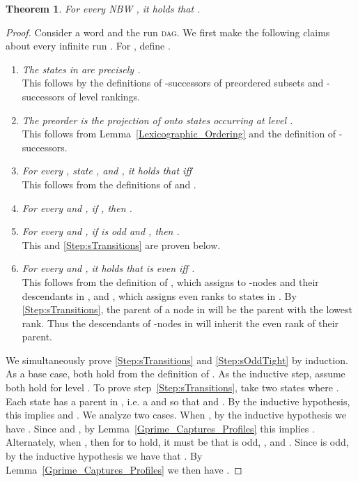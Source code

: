 \documentclass{LMCS}
\newcommand{\DAG}{\textsc{dag}\xspace}
\newtheorem{theorem}{Theorem}[section]
\begin{document}
\begin{theorem}\label{SR_Complement}
For every NBW , it holds that .
\end{theorem}
\begin{proof}
\cbstart
Consider a word  and the run \DAG . We first make the following claims
about every infinite run
.
For , define .

\begin{enumerate}[(1)]

\item\label{Step:psS} \textit{The states in  are precisely .}\\
This follows by the definitions of -successors of preordered subsets and 
-successors of level rankings.

\item\label{Step:pPreorder} \textit{The preorder  is the projection of 
onto states occurring at level .} \\
This follows from Lemma~\ref{Lexicographic_Ordering} and the definition of -successors. 

\item\label{Step:pTransitions} \textit{For every , state , and , it
holds that  iff }\\
This follows from the definitions of  and . 

\item\label{Step:sTransitions} \textit{For every  and , if , then .}

\item\label{Step:sOddTight} \textit{For every  and , if  is
odd and , then .}\\
This and \ref{Step:sTransitions} are proven below.

\item\label{Step:OddBottom} \textit{For every  and , it holds that  is
even iff . }\\
This follows from the definition of , which assigns  to -nodes and their
descendants in , and , which assigns even ranks to states in .  By
\ref{Step:sTransitions}, the parent of a node in  will be the parent with the lowest rank.
Thus the descendants of -nodes in  will inherit the even
rank of their parent.\vspace{6 pt}
\end{enumerate}

\noindent We simultaneously prove \ref{Step:sTransitions} and \ref{Step:sOddTight} by induction.  As a base
case, both hold from the definition of . As the inductive step, assume both hold for level
.
To prove step~\ref{Step:sTransitions}, take two states  where .  Each state has a parent in , i.e. a  and  so that  and
. By the inductive hypothesis, this implies 
 and .  We analyze two cases. When , by the inductive hypothesis
we have .  Since  and , by
Lemma~\ref{Gprime_Captures_Profiles} this implies .  Alternately,
when , then for  to hold, it must be that  is
odd, , and . Since  is odd, by the inductive hypothesis we
have that .  By Lemma~\ref{Gprime_Captures_Profiles} we then have
.


\end{proof}
\end{document}
